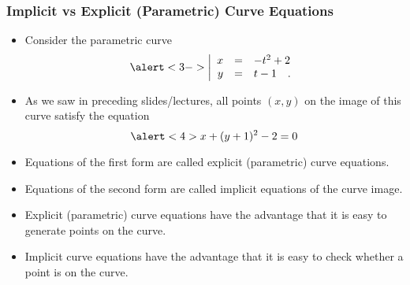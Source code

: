 \begin{frame}
\frametitle{Implicit vs Explicit (Parametric) Curve Equations}
\begin{itemize}
\item Consider the parametric curve 
\[\alert<3->{
\left|\begin{array}{rcl}x  & = & -t^2 + 2\\
y&=&t-1 \quad .
\end{array}\right.
}\]
\item<2-> As we saw in preceding slides/lectures, all points $(x,y)$ on the image of this curve satisfy the equation 
\[ \alert<4>{x+(y+1)^2 -2=0}\]
\item<3-> Equations of the first form are called explicit (parametric) curve equations.
\item<4-> Equations of the second form are called implicit equations of the curve image.
\item<5-> Explicit (parametric) curve equations have the advantage that it is easy to generate points on the curve. 
\item<6-> Implicit curve equations have the advantage that it is easy to check whether a point is on the curve.

\end{itemize}
\end{frame}